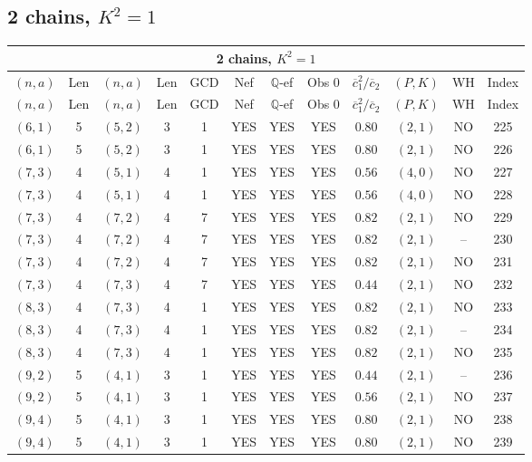 \subsection{2 chains, $K^2 = 1$}
\begin{longtable}{|c|c|c|c|c|c|c|c|c|c|c|c|}
\hline
\multicolumn{12}{|c|}{2 chains, $K^2 = 1$}\\
\hline
$(n,a)$ & Len & $(n,a)$ & Len & GCD & Nef & $\mathbb Q$-ef & Obs 0 & $\overline c_1^2 / \overline c_2$ & $(P,K)$ & WH & Index\\
\hline
\endfirsthead

\hline
$(n,a)$ & Len & $(n,a)$ & Len & GCD & Nef & $\mathbb Q$-ef & Obs 0 & $\overline c_1^2 / \overline c_2$ & $(P,K)$ & WH & Index\\
\hline
\endhead
\hline
\endfoot

$(6,1)$ & 5 & $(5,2)$ & 3 & 1 & YES & YES & YES & $0.80$ & $(2,1)$ & NO & 225\\
$(6,1)$ & 5 & $(5,2)$ & 3 & 1 & YES & YES & YES & $0.80$ & $(2,1)$ & NO & 226\\
$(7,3)$ & 4 & $(5,1)$ & 4 & 1 & YES & YES & YES & $0.56$ & $(4,0)$ & NO & 227\\
$(7,3)$ & 4 & $(5,1)$ & 4 & 1 & YES & YES & YES & $0.56$ & $(4,0)$ & NO & 228\\
$(7,3)$ & 4 & $(7,2)$ & 4 & 7 & YES & YES & YES & $0.82$ & $(2,1)$ & NO & 229\\
$(7,3)$ & 4 & $(7,2)$ & 4 & 7 & YES & YES & YES & $0.82$ & $(2,1)$ & -- & 230\\
$(7,3)$ & 4 & $(7,2)$ & 4 & 7 & YES & YES & YES & $0.82$ & $(2,1)$ & NO & 231\\
$(7,3)$ & 4 & $(7,3)$ & 4 & 7 & YES & YES & YES & $0.44$ & $(2,1)$ & NO & 232\\
$(8,3)$ & 4 & $(7,3)$ & 4 & 1 & YES & YES & YES & $0.82$ & $(2,1)$ & NO & 233\\
$(8,3)$ & 4 & $(7,3)$ & 4 & 1 & YES & YES & YES & $0.82$ & $(2,1)$ & -- & 234\\
$(8,3)$ & 4 & $(7,3)$ & 4 & 1 & YES & YES & YES & $0.82$ & $(2,1)$ & NO & 235\\
$(9,2)$ & 5 & $(4,1)$ & 3 & 1 & YES & YES & YES & $0.44$ & $(2,1)$ & -- & 236\\
$(9,2)$ & 5 & $(4,1)$ & 3 & 1 & YES & YES & YES & $0.56$ & $(2,1)$ & NO & 237\\
$(9,4)$ & 5 & $(4,1)$ & 3 & 1 & YES & YES & YES & $0.80$ & $(2,1)$ & NO & 238\\
$(9,4)$ & 5 & $(4,1)$ & 3 & 1 & YES & YES & YES & $0.80$ & $(2,1)$ & NO & 239\\

\end{longtable}
